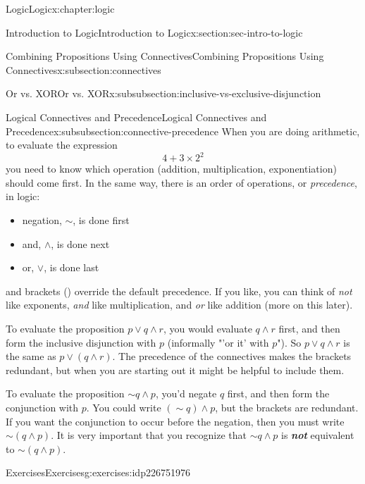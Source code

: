 \documentclass[twoside,10pt,]{book}
\newcommand{\alert}[1]{\textbf{\textit{#1}}}
\numberwithin{equation}{section}
\begin{document}
\begin{chapterptx}{Logic}{}{Logic}{}{}{x:chapter:logic}
\begin{sectionptx}{Introduction to Logic}{}{Introduction to Logic}{}{}{x:section:sec-intro-to-logic}
\begin{subsectionptx}{Combining Propositions Using Connectives}{}{Combining Propositions Using Connectives}{}{}{x:subsection:connectives}
\begin{subsubsectionptx}{Or vs. XOR}{}{Or vs. XOR}{}{}{x:subsubsection:inclusive-vs-exclusive-disjunction}
\end{subsubsectionptx}
%
%
\typeout{************************************************}
\typeout{************************************************}
%
\begin{subsubsectionptx}{Logical Connectives and Precedence}{}{Logical Connectives and Precedence}{}{}{x:subsubsection:connective-precedence}
When you are doing arithmetic, to evaluate the expression%
\begin{equation*}
4+3\times 2^2
\end{equation*}
you need to know which operation (addition, multiplication, exponentiation) should come first.  In the same way, there is an order of operations, or \emph{precedence}, in logic:%
\begin{itemize}[label=\textbullet]
\item{}negation, \(\sim\), is done first%
\item{}and, \({\wedge}\), is done next%
\item{}or, \({\vee}\), is done last%
\end{itemize}
and brackets () override the default precedence.  If you like, you can think of \emph{not} like exponents, \emph{and} like multiplication, and \emph{or} like addition (more on this later).%
\par
To evaluate the proposition \(p{\vee} q{\wedge} r\), you would evaluate \(q{\wedge} r\) first, and then form the inclusive disjunction with \(p\) (informally "'or it' with \(p\)").  So \(p{\vee} q{\wedge} r\) is the same as \(p{\vee}(q{\wedge} r)\).  The precedence of the connectives makes the brackets redundant, but when you are starting out it might be helpful to include them.%
\par
To evaluate the proposition \(\sim\!{q}{\wedge} p\), you'd negate \(q\) first, and then form the conjunction with \(p\).  You could write \((\sim\!{q}){\wedge} p\), but the brackets are redundant.  If you want the conjunction to occur before the negation, then you must write \(\sim\!(q{\wedge} p)\).  It is very important that you recognize that \(\sim\!{q}{\wedge} p\) is \alert{not} equivalent to \(\sim\! (q{\wedge} p)\).%
\end{subsubsectionptx}
\end{subsectionptx}
%
%
\typeout{************************************************}
\typeout{************************************************}
%
\begin{exercises-subsection}{Exercises}{}{Exercises}{}{}{g:exercises:idp226751976}

\end{exercises-subsection}
\end{sectionptx}
\end{chapterptx}
\end{document}
